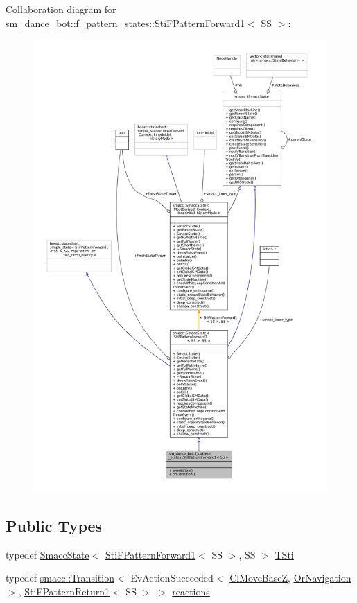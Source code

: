 Collaboration diagram for sm\+\_\+dance\+\_\+bot\+:\+:f\+\_\+pattern\+\_\+states\+:\+:Sti\+F\+Pattern\+Forward1$<$ SS $>$\+:
\nopagebreak
\begin{figure}[H]
\begin{center}
\leavevmode
\includegraphics[width=350pt]{structsm__dance__bot_1_1f__pattern__states_1_1StiFPatternForward1__coll__graph}
\end{center}
\end{figure}
\subsection*{Public Types}
\begin{DoxyCompactItemize}
\item 
typedef \hyperlink{classSmaccState}{Smacc\+State}$<$ \hyperlink{structsm__dance__bot_1_1f__pattern__states_1_1StiFPatternForward1}{Sti\+F\+Pattern\+Forward1}$<$ SS $>$, SS $>$ \hyperlink{structsm__dance__bot_1_1f__pattern__states_1_1StiFPatternForward1_a7dff4a86e12407b2daf0d34aba22d21b}{T\+Sti}
\item 
typedef \hyperlink{classsmacc_1_1Transition}{smacc\+::\+Transition}$<$ Ev\+Action\+Succeeded$<$ \hyperlink{classmove__base__z__client_1_1ClMoveBaseZ}{Cl\+Move\+BaseZ}, \hyperlink{classsm__dance__bot_1_1OrNavigation}{Or\+Navigation} $>$, \hyperlink{structsm__dance__bot_1_1f__pattern__states_1_1StiFPatternReturn1}{Sti\+F\+Pattern\+Return1}$<$ SS $>$ $>$ \hyperlink{structsm__dance__bot_1_1f__pattern__states_1_1StiFPatternForward1_adea4360b0d236b8e8af58c452630380f}{reactions}
\end{DoxyCompactItemize}
